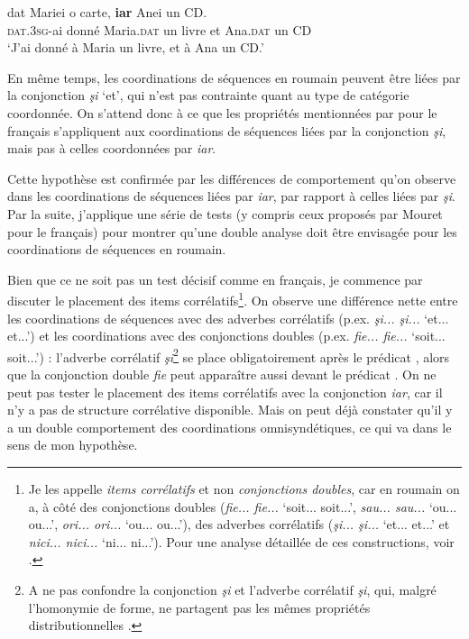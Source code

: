 \ex  
\gll {} dat  Mariei  o  carte,  \textbf{iar}  Anei  un  CD. \label{ch2:ex302b}\\
\textsc{dat.3sg}{}-ai  donné  Maria.\textsc{dat}  un  livre  et  Ana.\textsc{dat}  un  CD\\
\glt ‘J’ai donné à Maria un livre, et à Ana un CD.’
\z
\z

En même temps, les coordinations de séquences en roumain peuvent être liées par la conjonction \textit{şi} ‘et’, qui n’est pas contrainte quant au type de catégorie coordonnée. On s’attend donc à ce que les propriétés mentionnées par \citet{Mouret2006,Mouret2007,Mouret2008} pour le français s’appliquent aux coordinations de séquences liées par la conjonction \textit{şi}, mais pas à celles coordonnées par \textit{iar}.

Cette hypothèse est confirmée par les différences de comportement qu’on observe dans les coordinations de séquences liées par \textit{iar}, par rapport à celles liées par \textit{şi}. Par la suite, j’applique une série de tests (y compris ceux proposés par Mouret pour le français) pour montrer qu’une double analyse doit être envisagée pour les coordinations de séquences en roumain.

Bien que ce ne soit pas un test décisif comme en français, je commence par discuter le placement des items corrélatifs\footnote{
 Je les appelle \textit{items corrélatifs} et non \textit{conjonctions doubles}, car en roumain on a, à côté des conjonctions doubles (\textit{fie... fie...} ‘soit... soit...’, \textit{sau... sau...} ‘ou... ou...’, \textit{ori... ori...} ‘ou... ou...’), des adverbes corrélatifs (\textit{şi... şi...} ‘et... et...’ et \textit{nici... nici...} ‘ni... ni...’). Pour une analyse détaillée de ces constructions, voir \citet{Bilbiie2008,Bilbiie2011}.}. On observe une différence nette entre les coordinations de séquences avec des adverbes corrélatifs (p.ex. \textit{şi... şi...} ‘et... et...’) et les coordinations avec des conjonctions doubles (p.ex. \textit{fie... fie...} ‘soit... soit...’) : l’adverbe corrélatif \textit{şi}\footnote{
 A ne pas confondre la conjonction \textit{şi} et l’adverbe corrélatif \textit{şi}, qui, malgré l’homonymie de forme, ne partagent pas les mêmes propriétés distributionnelles \citep{Bilbiie2008}.} se place obligatoirement après le prédicat , alors que la conjonction double \textit{fie} peut apparaître aussi devant le prédicat . On ne peut pas tester le placement des items corrélatifs avec la conjonction \textit{iar}, car il n’y a pas de structure corrélative disponible. Mais on peut déjà constater qu’il y a un double comportement des coordinations omnisyndétiques, ce qui va dans le sens de mon hypothèse.

